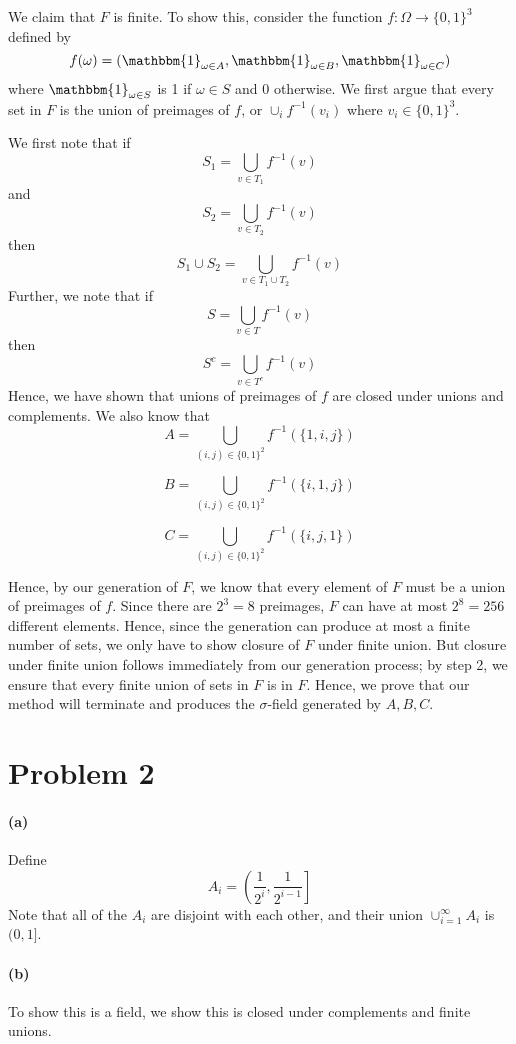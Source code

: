 \documentclass[10pt,letter]{article}
\begin{document}
We claim that $F$ is finite. To show this, consider the function $ f:\Omega \to \{ 0,1 \}^3 $ defined by \[ f(\omega) = (\mathbbm{1}_{\omega \in A}, \mathbbm{1}_{\omega \in B}, \mathbbm{1}_{\omega \in C} )\] where $\mathbbm{1}_{\omega \in S}$ is 1 if $\omega \in S$ and 0 otherwise. We first argue that every set in $F$ is the union of preimages of $f$, or $\cup_i f^{-1}(v_i)$ where $v_i \in \{0,1\}^3$.

We first note that if \[ S_1 = \bigcup_{v \in T_1} f^{-1}(v) \] and \[ S_2 = \bigcup_{v \in T_2} f^{-1}(v)\]then \[ S_1 \cup S_2 = \bigcup_{v \in T_1\cup T_2} f^{-1}(v)\] Further, we note that if \[ S = \bigcup_{v \in T} f^{-1}(v)\]then \[S^c = \bigcup_{v \in T^c} f^{-1}(v)\]
Hence, we have shown that unions of preimages of $f$ are closed under unions and complements. We also know that
\[ A = \bigcup_{(i,j) \in \{0, 1\}^2} f^{-1}(\{1, i, j\} ) \]

\[ B = \bigcup_{(i,j) \in \{0, 1\}^2} f^{-1}(\{i, 1, j\} ) \]

\[ C = \bigcup_{(i,j) \in \{0, 1\}^2} f^{-1}(\{i, j, 1\} ) \]

Hence, by our generation of $F$, we know that every element of $F$ must be a union of preimages of $f$. Since there are $2^3 = 8$ preimages, $F$ can have at most $2^8 = 256$ different elements. Hence, since the generation can produce at most a finite number of sets, we only have to show closure of $F$ under finite union. But closure under finite union follows immediately from our generation process; by step 2, we ensure that every finite union of sets in $F$ is in $F$. Hence, we prove that our method will terminate and produces the $\sigma$-field generated by $A, B, C$.

\section*{Problem 2}

\paragraph{(a)}
Define
\[ A_i = \left( \frac{1}{2^i}, \frac{1}{2^{i-1}} \right] \]
Note that all of the $A_i$ are disjoint with each other, and their union $\cup_{i=1}^\infty A_i$ is $(0,1]$.

\paragraph{(b)} To show this is a field, we show this is closed under complements and finite unions.
\end{document}
